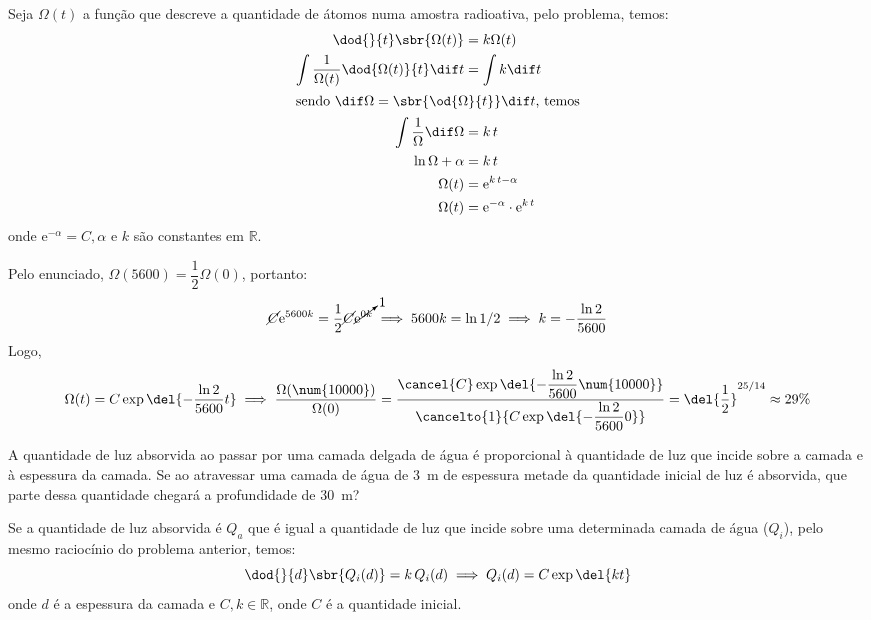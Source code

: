 \documentclass[]{IMTexam}
\begin{document}
\begin{questions}
	\begin{solution}
		Seja $ \Omega(t) $ a função que descreve a quantidade de átomos numa amostra radioativa, pelo problema, temos:
		\begin{align*}
			\dod{}{t}\sbr{\Omega(t)}                         & =k\Omega(t)                                 \\
			\int\dfrac{1}{\Omega(t)}\dod{\Omega(t)}{t}\dif t & =\int k\dif t                               \\
			\intertext{sendo $ \dif \Omega=\sbr{\od{\Omega}{t}}\dif t $, temos}
			\int\dfrac{1}{\Omega}\dif \Omega                 & =k\,t                                       \\
			\ln\Omega+\alpha                                 & =k\,t                                       \\
			\Omega(t)                                        & =\mathrm{e}^{k\,t-\alpha}                   \\
			\Omega(t)                                        & =\mathrm{e}^{-\alpha}\cdot\mathrm{e}^{k\,t}
		\end{align*}
		onde $ \mathrm{e}^{-\alpha}=C,\alpha $ e $ k $ são constantes em $\mathbb{R}$.

		Pelo enunciado, $ \Omega(5600)=\dfrac{1}{2}\Omega(0) $, portanto:
		\[ \cancel{C}\mathrm{e}^{5600k}=\dfrac{1}{2}\cancel{C}\cancelto{1}{\mathrm{e}^{0k}}\implies 5600k=\ln{1/2}\implies k=-\dfrac{\ln{2}}{5600} \]
		Logo,  \[ \Omega(t)=C\exp{\del{-\dfrac{\ln{2}}{5600}t}}\implies\dfrac{\Omega(\num{10000})}{\Omega(0)}=\dfrac{\cancel{C}\exp{\del{-\dfrac{\ln{2}}{5600}\num{10000}}}}{\cancelto{1}{C\exp{\del{-\dfrac{\ln{2}}{5600}0}}}}=\del{\dfrac{1}{2}}^{25/14}\approx 29\% \]
	\end{solution}

	\question
	A quantidade de luz absorvida ao passar por uma camada delgada de água é proporcional à quantidade de luz que incide sobre a camada e à espessura da camada. Se ao atravessar uma camada de água de \SI{3}{\meter} de espessura metade da quantidade inicial de luz é absorvida, que parte dessa quantidade chegará a profundidade de \SI{30}{\meter}?

	\begin{solution}
		Se a quantidade de luz absorvida é $ Q_a $ que é igual a quantidade de luz que incide sobre uma determinada camada de água ($ Q_i $), pelo mesmo raciocínio do problema anterior, temos:
		\[ \dod{}{d}\sbr{Q_i(d)}=k\,Q_i(d)\implies Q_i(d)=C\exp{\del{kt}} \] onde $ d $ é a espessura da camada e $ C,k\in\mathbb{R} $, onde $ C $ é a quantidade inicial.


\end{solution}
\end{questions}
\end{document}
